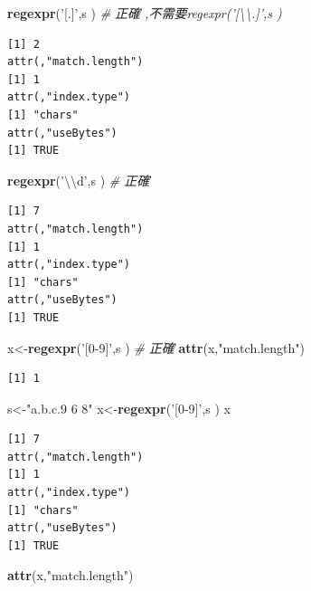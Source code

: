 \documentclass[]{book}
\newenvironment{Shaded}{\begin{snugshade}}{\end{snugshade}}
\newcommand{\CharTok}[1]{\textcolor[rgb]{0.31,0.60,0.02}{#1}}
\newcommand{\CommentTok}[1]{\textcolor[rgb]{0.56,0.35,0.01}{\textit{#1}}}
\newcommand{\KeywordTok}[1]{\textcolor[rgb]{0.13,0.29,0.53}{\textbf{#1}}}
\newcommand{\NormalTok}[1]{#1}
\newcommand{\StringTok}[1]{\textcolor[rgb]{0.31,0.60,0.02}{#1}}
\theoremstyle{definition}
\theoremstyle{definition}
\theoremstyle{definition}
\theoremstyle{remark}
\begin{document}
\begin{Shaded}
\begin{Highlighting}[]
\KeywordTok{regexpr}\NormalTok{(}\StringTok{'[.]'}\NormalTok{,s ) }\CommentTok{# 正確 ,不需要regexpr('[\textbackslash{}\textbackslash{}.]',s )}
\end{Highlighting}
\end{Shaded}

\begin{verbatim}
[1] 2
attr(,"match.length")
[1] 1
attr(,"index.type")
[1] "chars"
attr(,"useBytes")
[1] TRUE
\end{verbatim}

\begin{Shaded}
\begin{Highlighting}[]
\KeywordTok{regexpr}\NormalTok{(}\StringTok{'}\CharTok{\textbackslash{}\textbackslash{}}\StringTok{d'}\NormalTok{,s ) }\CommentTok{# 正確}
\end{Highlighting}
\end{Shaded}

\begin{verbatim}
[1] 7
attr(,"match.length")
[1] 1
attr(,"index.type")
[1] "chars"
attr(,"useBytes")
[1] TRUE
\end{verbatim}

\begin{Shaded}
\begin{Highlighting}[]
\NormalTok{x<-}\KeywordTok{regexpr}\NormalTok{(}\StringTok{'[0-9]'}\NormalTok{,s ) }\CommentTok{# 正確}
\KeywordTok{attr}\NormalTok{(x,}\StringTok{"match.length"}\NormalTok{)}
\end{Highlighting}
\end{Shaded}

\begin{verbatim}
[1] 1
\end{verbatim}

\begin{Shaded}
\begin{Highlighting}[]
\NormalTok{s<-}\StringTok{"a.b.c.9 6 8"}
\NormalTok{x<-}\KeywordTok{regexpr}\NormalTok{(}\StringTok{'[0-9]'}\NormalTok{,s ) }
\NormalTok{x}
\end{Highlighting}
\end{Shaded}

\begin{verbatim}
[1] 7
attr(,"match.length")
[1] 1
attr(,"index.type")
[1] "chars"
attr(,"useBytes")
[1] TRUE
\end{verbatim}

\begin{Shaded}
\begin{Highlighting}[]
\KeywordTok{attr}\NormalTok{(x,}\StringTok{"match.length"}\NormalTok{)}
\end{Highlighting}
\end{Shaded}
\end{document}
